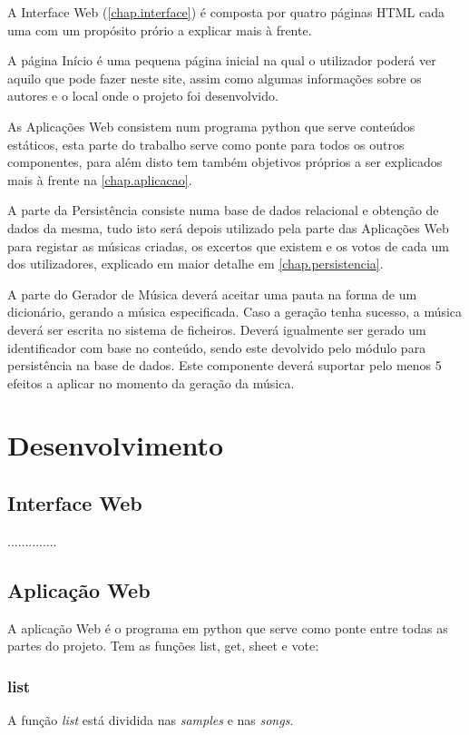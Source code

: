 \documentclass{report}
\begin{document}
A Interface Web (\autoref{chap.interface}) é composta por quatro páginas HTML cada uma com 
um propósito prório a explicar mais à frente.

A página Início é uma pequena página inicial na qual o utilizador poderá ver 
aquilo que pode fazer neste site, assim como algumas informações sobre os autores e o local onde o projeto foi desenvolvido.
	
As Aplicações Web consistem num programa python que serve conteúdos estáticos, 
esta parte do trabalho serve como ponte para todos os outros componentes, para além disto tem também objetivos próprios a ser 
explicados mais à frente na \autoref{chap.aplicacao}.

A parte da Persistência consiste numa base de dados relacional e obtenção de dados da mesma, 
tudo isto será depois utilizado pela parte das Aplicações Web para registar as músicas criadas, os excertos que existem e os 
votos de cada um dos utilizadores, explicado em maior detalhe em \autoref{chap.persistencia}.

A parte do Gerador de Música deverá aceitar uma pauta na forma de um dicionário, gerando a música
especificada. Caso a geração tenha sucesso, a música deverá ser escrita no sistema de
ficheiros. Deverá igualmente ser gerado um identificador com base no conteúdo, sendo
este devolvido pelo módulo para persistência na base de dados.
Este componente deverá suportar pelo menos 5 efeitos a aplicar no momento da geração
da música.

\chapter{Desenvolvimento}
\label{chap.desenvolvimento}
	
\section{Interface Web}
\label{chap.interface}
..............

\section{Aplicação Web}
\label{chap.aplicacao}
A aplicação Web é o programa em python que serve como ponte entre todas as partes do projeto.
Tem as funções list, get, sheet e vote:

\subsection{list}
A função \textit{list} está dividida nas \textit{samples} e nas \textit{songs}.
\end{document}
